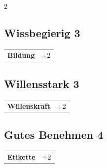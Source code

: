 \begin{multicols}{2}
\begin{tcolorbox}
\vspace{3mm}



\end{tcolorbox}

\begin{tcolorbox}
    \subsection*{Wissbegierig \hfill \small{3 }}
    \tcblower




\begin{tabular}{@{}ll@{}}
    \textbf{Bildung} & +2\\
\end{tabular}


\end{tcolorbox}

\begin{tcolorbox}
    \subsection*{Willensstark \hfill \small{3 }}
    \tcblower




\begin{tabular}{@{}ll@{}}
    \textbf{Willenskraft} & +2\\
\end{tabular}


\end{tcolorbox}

\begin{tcolorbox}
    \subsection*{Gutes Benehmen \hfill \small{4 }}
    \tcblower




\begin{tabular}{@{}ll@{}}
    \textbf{Etikette} & +2\\
\end{tabular}


\end{tcolorbox}
\end{multicols}
